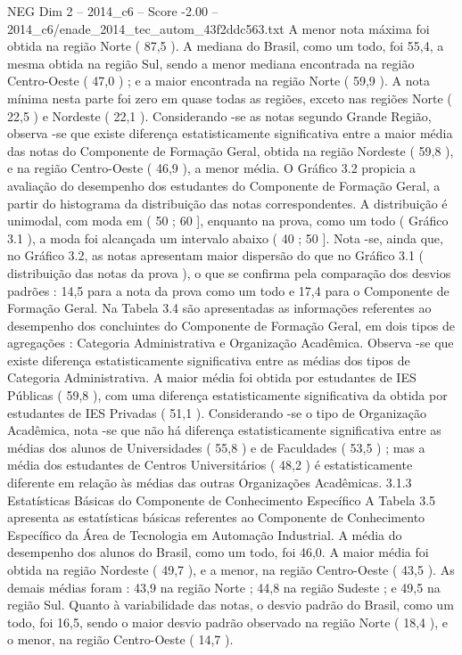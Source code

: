 \begin{textsample}{NEG Dim 2 – 2014\_c6 – Score -2.00 – 2014\_c6/enade\_2014\_tec\_autom\_43f2ddc563.txt}
A menor nota máxima foi obtida na região Norte ( 87,5 ).
A mediana do Brasil, como um todo, foi 55,4, a mesma obtida na região Sul, sendo a menor mediana encontrada na região Centro-Oeste ( 47,0 ) ; e a maior encontrada na região Norte ( 59,9 ).
A nota mínima nesta parte foi zero em quase todas as regiões, exceto nas regiões Norte ( 22,5 ) e Nordeste ( 22,1 ).
Considerando -se as notas segundo Grande Região, observa -se que existe diferença estatisticamente significativa entre a maior média das notas do Componente de Formação Geral, obtida na região Nordeste ( 59,8 ), e na região Centro-Oeste ( 46,9 ), a menor média.
O Gráfico 3.2 propicia a avaliação do desempenho dos estudantes do Componente de Formação Geral, a partir do histograma da distribuição das notas correspondentes.
A distribuição é unimodal, com moda em ( 50 ; 60 ], enquanto na prova, como um todo ( Gráfico 3.1 ), a moda foi alcançada um intervalo abaixo ( 40 ; 50 ].
Nota -se, ainda que, no Gráfico 3.2, as notas apresentam maior dispersão do que no Gráfico 3.1 ( distribuição das notas da prova ), o que se confirma pela comparação dos desvios padrões : 14,5 para a nota da prova como um todo e 17,4 para o Componente de Formação Geral.
Na Tabela 3.4 são apresentadas as informações referentes ao desempenho dos concluintes do Componente de Formação Geral, em dois tipos de agregações : Categoria Administrativa e Organização Acadêmica.
Observa -se que existe diferença estatisticamente significativa entre as médias dos tipos de Categoria Administrativa.
A maior média foi obtida por estudantes de IES Públicas ( 59,8 ), com uma diferença estatisticamente significativa da obtida por estudantes de IES Privadas ( 51,1 ).
Considerando -se o tipo de Organização Acadêmica, nota -se que não há diferença estatisticamente significativa entre as médias dos alunos de Universidades ( 55,8 ) e de Faculdades ( 53,5 ) ; mas a média dos estudantes de Centros Universitários ( 48,2 ) é estatisticamente diferente em relação às médias das outras Organizações Acadêmicas. 3.1.3 Estatísticas Básicas do Componente de Conhecimento Específico A Tabela 3.5 apresenta as estatísticas básicas referentes ao Componente de Conhecimento Específico da Área de Tecnologia em Automação Industrial.
A média do desempenho dos alunos do Brasil, como um todo, foi 46,0.
A maior média foi obtida na região Nordeste ( 49,7 ), e a menor, na região Centro-Oeste ( 43,5 ).
As demais médias foram : 43,9 na região Norte ; 44,8 na região Sudeste ; e 49,5 na região Sul.
Quanto à variabilidade das notas, o desvio padrão do Brasil, como um todo, foi 16,5, sendo o maior desvio padrão observado na região Norte ( 18,4 ), e o menor, na região Centro-Oeste ( 14,7 ).

\end{textsample}
